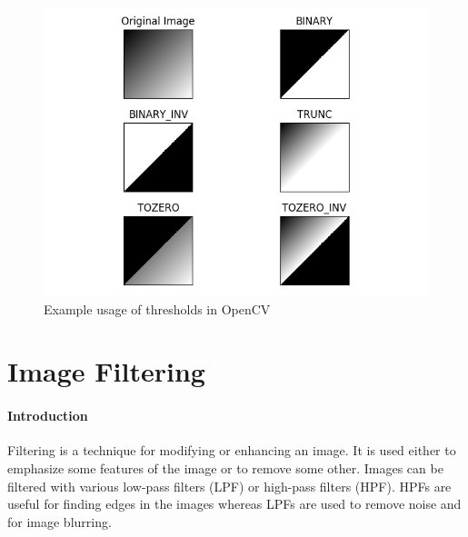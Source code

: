 \begin{figure}
	\centering
	\includegraphics[width=\textwidth]{images/thresholds_example}
	\caption{Example usage of thresholds in OpenCV}
	\label{fig:threshold_examples}
\end{figure}

\section{Image Filtering}
\paragraph{Introduction}
Filtering is a technique for modifying or enhancing an image. It is used either to emphasize some features of the image or to remove some other. Images can be filtered with various low-pass filters (LPF) or high-pass filters (HPF). HPFs are useful for finding edges in the images whereas LPFs are used to remove noise and for image blurring.

